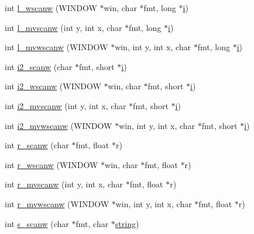 \begin{DoxyCompactItemize}
\item 
int \hyperlink{C-macros_8c_ae2aa5264dfbd2042fa25e8e70bb445fe}{l\+\_\+wscanw} (W\+I\+N\+D\+OW $\ast$win, char $\ast$fmt, long $\ast$\hyperlink{intro__blas1_83_8txt_a8ba82a50c0c2c12d5f6a77f7e4651c0b}{i})
\item 
int \hyperlink{C-macros_8c_a27ab41c1f51bd6ad8029350446a577ea}{l\+\_\+mvscanw} (int y, int x, char $\ast$fmt, long $\ast$\hyperlink{intro__blas1_83_8txt_a8ba82a50c0c2c12d5f6a77f7e4651c0b}{i})
\item 
int \hyperlink{C-macros_8c_afd4ce2c83673e3073a46a6c0e05b235b}{l\+\_\+mvwscanw} (W\+I\+N\+D\+OW $\ast$win, int y, int x, char $\ast$fmt, long $\ast$\hyperlink{intro__blas1_83_8txt_a8ba82a50c0c2c12d5f6a77f7e4651c0b}{i})
\item 
int \hyperlink{C-macros_8c_ad51e0ab478b4039b3191e38e31ee0676}{i2\+\_\+scanw} (char $\ast$fmt, short $\ast$\hyperlink{intro__blas1_83_8txt_a8ba82a50c0c2c12d5f6a77f7e4651c0b}{i})
\item 
int \hyperlink{C-macros_8c_a44593e3cd853674d1c25ad8295a5e7d2}{i2\+\_\+wscanw} (W\+I\+N\+D\+OW $\ast$win, char $\ast$fmt, short $\ast$\hyperlink{intro__blas1_83_8txt_a8ba82a50c0c2c12d5f6a77f7e4651c0b}{i})
\item 
int \hyperlink{C-macros_8c_ac3ddc9a07837b44a0d66ef085f764609}{i2\+\_\+mvscanw} (int y, int x, char $\ast$fmt, short $\ast$\hyperlink{intro__blas1_83_8txt_a8ba82a50c0c2c12d5f6a77f7e4651c0b}{i})
\item 
int \hyperlink{C-macros_8c_aa6f3d74bf85893265213c40cb5b732e6}{i2\+\_\+mvwscanw} (W\+I\+N\+D\+OW $\ast$win, int y, int x, char $\ast$fmt, short $\ast$\hyperlink{intro__blas1_83_8txt_a8ba82a50c0c2c12d5f6a77f7e4651c0b}{i})
\item 
int \hyperlink{C-macros_8c_ae894ccf3428f2f98a5a10a654b34180a}{r\+\_\+scanw} (char $\ast$fmt, float $\ast$r)
\item 
int \hyperlink{C-macros_8c_a8e85ec34aaf96f801923ac941e9435c4}{r\+\_\+wscanw} (W\+I\+N\+D\+OW $\ast$win, char $\ast$fmt, float $\ast$r)
\item 
int \hyperlink{C-macros_8c_a63197ac5eb05fa04cb88458e24ba8b98}{r\+\_\+mvscanw} (int y, int x, char $\ast$fmt, float $\ast$r)
\item 
int \hyperlink{C-macros_8c_a7db28527589679384ae2e79c665eddb4}{r\+\_\+mvwscanw} (W\+I\+N\+D\+OW $\ast$win, int y, int x, char $\ast$fmt, float $\ast$r)
\item 
int \hyperlink{C-macros_8c_a1e1dafd3d6cad8ea2d5f8609c242066e}{s\+\_\+scanw} (char $\ast$fmt, char $\ast$\hyperlink{what__overview_81_8txt_a74cb7e955273b9f9157b4f0c18a38849}{string})

\end{DoxyCompactItemize}
